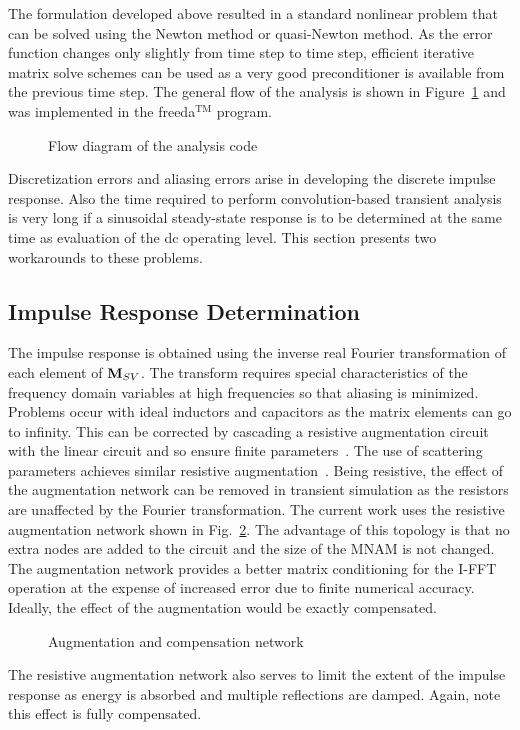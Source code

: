 The formulation developed above resulted in a standard nonlinear
problem that can be solved using the Newton method or quasi-Newton
method. As the error function changes only slightly from time step to
time step, efficient iterative matrix solve schemes can be used as a
very good preconditioner is available from the previous time step.
The general flow of the analysis is shown in
Figure~\ref{transient_flow} and was implemented in the freeda$^{\mathrm{TM}}$
program.
%
\begin{figure}[ht]
\centerline{\epsfxsize=1.6in }
\caption{Flow diagram of the analysis code} \label{transient_flow}
\end{figure}
Discretization errors and aliasing errors arise in developing the
discrete impulse response. Also the time required to perform
convolution-based transient analysis is very long if a sinusoidal
steady-state response is to be determined at the same time as
evaluation of the dc operating level.  This section presents two
workarounds to these problems.


\subsection{Impulse Response Determination}

The impulse response is obtained using the inverse real Fourier
transformation of each element of ${\bf M}_{SV}$. The transform
requires special characteristics of the frequency domain variables at
high frequencies so that aliasing is minimized. Problems occur with
ideal inductors and capacitors as the matrix elements can go to
infinity. This can be corrected by cascading a resistive augmentation
circuit with the linear circuit and so ensure finite
parameters~\cite{mete,basel:paper}. The use of scattering parameters
achieves similar resistive augmentation~\cite{theta}. Being resistive,
the effect of the augmentation network can be removed in transient
simulation as the resistors are unaffected by the Fourier
transformation. The current work uses the resistive augmentation
network shown in Fig.~\ref{augmentation}. The advantage of this
topology is that no extra nodes are added to the circuit and the size
of the MNAM is not changed. The augmentation network provides a better
matrix conditioning for the I-FFT operation at the expense of
increased error due to finite numerical accuracy. Ideally, the effect
of the augmentation would be exactly compensated.
%
\begin{figure}[ht]
\centerline{\epsfxsize=2.7in }
\caption{Augmentation and compensation network}
\label{augmentation}
\end{figure}
%
The resistive augmentation network also serves to limit the extent of
the impulse response as energy is absorbed and multiple reflections
are damped. Again, note this effect is fully compensated.

